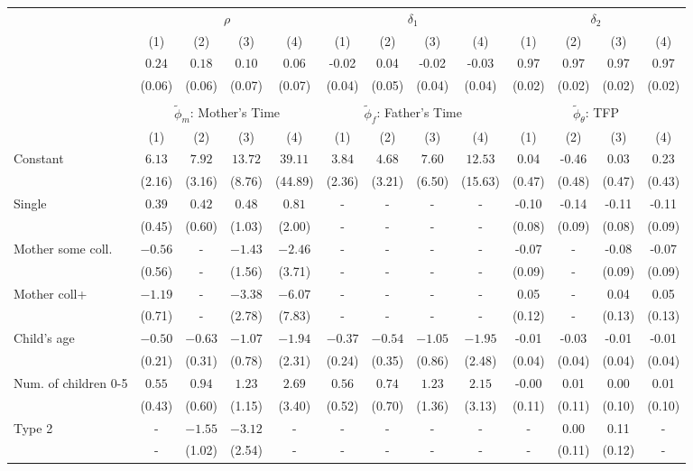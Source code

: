 \begin{tabular}{lcccccccccccc}\\\toprule
 & \multicolumn{4}{c}{$\rho$} & \multicolumn{4}{c}{$\delta_{1}$} & \multicolumn{4}{c}{$\delta_{2}$} \\
&(1)&(2)&(3)&(4)&(1)&(2)&(3)&(4)&(1)&(2)&(3)&(4)\\\cmidrule(r){2-5}\cmidrule(r){6-9}\cmidrule(r){10-13}
&$0.24$&$0.18$&$0.10$&$0.06$&-0.02&0.04&-0.02&-0.03&0.97&0.97&0.97&0.97\\
&(0.06)&(0.06)&(0.07)&(0.07)&(0.04)&(0.05)&(0.04)&(0.04)&(0.02)&(0.02)&(0.02)&(0.02)\\
&&&&&&&&&&&&\\
 & \multicolumn{4}{c}{$\tilde{\phi}_{m}$: Mother's Time} & \multicolumn{4}{c}{$\tilde{\phi}_{f}$: Father's Time} & \multicolumn{4}{c}{$\tilde{\phi}_{\theta}$: TFP} \\
&(1)&(2)&(3)&(4)&(1)&(2)&(3)&(4)&(1)&(2)&(3)&(4)\\\cmidrule(r){2-5}\cmidrule(r){6-9}\cmidrule(r){10-13}
Constant&$6.13$&$7.92$&$13.72$&$39.11$&$3.84$&$4.68$&$7.60$&$12.53$&0.04&-0.46&0.03&0.23\\
&(2.16)&(3.16)&(8.76)&(44.89)&(2.36)&(3.21)&(6.50)&(15.63)&(0.47)&(0.48)&(0.47)&(0.43)\\
Single&$0.39$&$0.42$&$0.48$&$0.81$&-&-&-&-&-0.10&-0.14&-0.11&-0.11\\
&(0.45)&(0.60)&(1.03)&(2.00)&-&-&-&-&(0.08)&(0.09)&(0.08)&(0.09)\\
Mother some coll.&$-0.56$&-&$-1.43$&$-2.46$&-&-&-&-&-0.07&-&-0.08&-0.07\\
&(0.56)&-&(1.56)&(3.71)&-&-&-&-&(0.09)&-&(0.09)&(0.09)\\
Mother coll+&$-1.19$&-&$-3.38$&$-6.07$&-&-&-&-&0.05&-&0.04&0.05\\
&(0.71)&-&(2.78)&(7.83)&-&-&-&-&(0.12)&-&(0.13)&(0.13)\\
Child's age&$-0.50$&$-0.63$&$-1.07$&$-1.94$&$-0.37$&$-0.54$&$-1.05$&$-1.95$&-0.01&-0.03&-0.01&-0.01\\
&(0.21)&(0.31)&(0.78)&(2.31)&(0.24)&(0.35)&(0.86)&(2.48)&(0.04)&(0.04)&(0.04)&(0.04)\\
Num. of children 0-5&$0.55$&$0.94$&$1.23$&$2.69$&$0.56$&$0.74$&$1.23$&$2.15$&-0.00&0.01&0.00&0.01\\
&(0.43)&(0.60)&(1.15)&(3.40)&(0.52)&(0.70)&(1.36)&(3.13)&(0.11)&(0.11)&(0.10)&(0.10)\\
Type 2&-&$-1.55$&$-3.12$&-&-&-&-&-&-&0.00&0.11&-\\
&-&(1.02)&(2.54)&-&-&-&-&-&-&(0.11)&(0.12)&-\\

\end{tabular}
